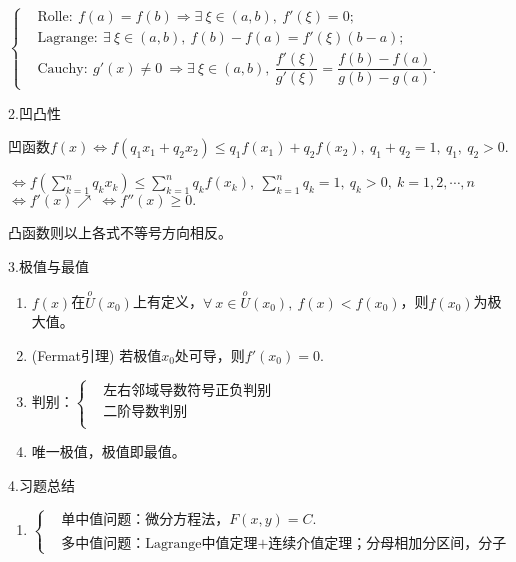 \documentclass[UTF8]{ctexart}
\numberwithin{equation}{section}
\numberwithin{figure}{section}
\numberwithin{table}{section}
\newcommand\no{\noindent}
\newcommand\dis{\displaystyle}
\newcommand\ls{\leqslant}
\newcommand\gs{\geqslant}
\newcommand\sumkfn{\dis\sum\limits_{k=1}^n}
\begin{document}
\begin{spacing}{2}
$\left\{\begin{aligned}
&\text{Rolle}:\ f(a)=f(b)\Longrightarrow\exists\ \xi\in(a,b),\ f'(\xi)=0;\\
&\text{Lagrange}:\ \exists\ \xi\in(a,b),\ f(b)-f(a)=f'(\xi)(b-a);\\
&\text{Cauchy}:\ g'(x)\neq0\ \Longrightarrow\exists\ \xi\in(a,b),\ \dfrac{f'(\xi)}{g'(\xi)}=\dfrac{f(b)-f(a)}{g(b)-g(a)}.
\end{aligned}\right.$

\vspace{0.4cm}

\no2.凹凸性

凹函数$f(x)\Leftrightarrow f(q_1x_1+q_2x_2)\ls q_1f(x_1)+q_2f(x_2),\ q_1+q_2=1,
\ q_1,\ q_2>0.$

\vspace{0.3cm}

$\Leftrightarrow f\left(\sumkfn q_kx_k\right)\ls\sumkfn q_kf(x_k),
\ \sumkfn q_k=1,\ q_k>0,\ k=1,2,\cdots,n$
$\Leftrightarrow f'(x)\nearrow\ \Leftrightarrow f''(x)\gs0.$

\vspace{0.3cm}

凸函数则以上各式不等号方向相反。

\no3.极值与最值

\begin{enumerate}[itemindent=1.4em, label=(\arabic*)]

\item $f(x)$在$\overset{o}{U} (x_0)$上有定义，$\forall \ x\in \overset{o}{U}(x_0),
\ f(x)<f(x_0)$，则$f(x_0)$为极大值。

\item (Fermat引理) 若极值$x_0$处可导，则$f'(x_0)=0.$

\item $\text{判别：}\left\{\begin{aligned}
&\text{左右邻域导数符号正负判别}\\
&\text{二阶导数判别}\\
\end{aligned}\right.$

\item 唯一极值，极值即最值。

\end{enumerate}

\no4.习题总结

\begin{enumerate}[itemindent=1.4em, label=(\arabic*)]

\item $\left\{\begin{aligned}
&\text{单中值问题：微分方程法，} F(x,y)=C.\\
&\text{多中值问题：Lagrange中值定理+连续介值定理；分母相加分区间，分子相加分函值。}
\end{aligned}\right.$


\end{enumerate}
\end{spacing}
\end{document}
